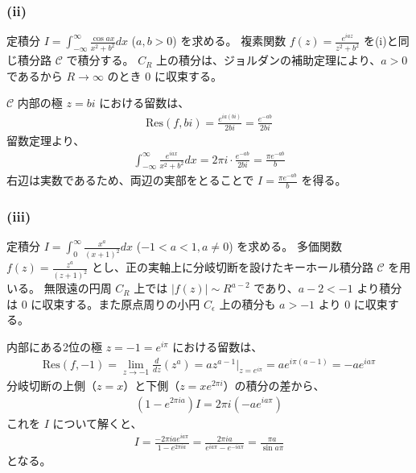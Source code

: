 \documentclass[platex,dvipdfmx,a4paper]{jsarticle}
\begin{document}
  \subsubsection*{(ii)}
  定積分 $I = \int_{-\infty}^{\infty} \frac{\cos ax}{x^2+b^2} dx$ ($a, b > 0$) を求める。
  複素関数 $f(z) = \frac{e^{iaz}}{z^2+b^2}$ を(i)と同じ積分路 $\mathcal{C}$ で積分する。
  $C_R$ 上の積分は、ジョルダンの補助定理により、$a > 0$ であるから $R \to \infty$ のとき $0$ に収束する。

  $\mathcal{C}$ 内部の極 $z=bi$ における留数は、
  \begin{align*}
  \text{Res}(f, bi) = \frac{e^{ia(bi)}}{2bi} = \frac{e^{-ab}}{2bi}
  \end{align*}
  留数定理より、
  \begin{align*}
  \int_{-\infty}^{\infty} \frac{e^{iax}}{x^2+b^2} dx = 2\pi i \cdot \frac{e^{-ab}}{2bi} = \frac{\pi e^{-ab}}{b}
  \end{align*}
  右辺は実数であるため、両辺の実部をとることで $I = \frac{\pi e^{-ab}}{b}$ を得る。

  \subsubsection*{(iii)}
  定積分 $I = \int_{0}^{\infty} \frac{x^a}{(x+1)^2} dx$ ($-1 < a < 1, a \neq 0$) を求める。
  多価関数 $f(z) = \frac{z^a}{(z+1)^2}$ とし、正の実軸上に分岐切断を設けたキーホール積分路 $\mathcal{C}$ を用いる。
  無限遠の円周 $C_R$ 上では $|f(z)| \sim R^{a-2}$ であり、$a-2 < -1$ より積分は $0$ に収束する。また原点周りの小円 $C_\epsilon$ 上の積分も $a > -1$ より $0$ に収束する。

  内部にある2位の極 $z = -1 = e^{i\pi}$ における留数は、
  \begin{align*}
  \text{Res}(f, -1) = \lim_{z \to -1} \frac{d}{dz} (z^a) = a z^{a-1} \big|_{z=e^{i\pi}} = a e^{i\pi(a-1)} = -a e^{ia\pi}
  \end{align*}
  分岐切断の上側（$z=x$）と下側（$z=xe^{2\pi i}$）の積分の差から、
  \begin{align*}
  \left( 1 - e^{2\pi i a} \right) I = 2\pi i (-a e^{ia\pi})
  \end{align*}
  これを $I$ について解くと、
  \begin{align*}
  I = \frac{-2\pi i a e^{ia\pi}}{1 - e^{2\pi i a}} = \frac{2\pi i a}{e^{ia\pi} - e^{-ia\pi}} = \frac{\pi a}{\sin a\pi}
  \end{align*}
  となる。
  
\end{document}

